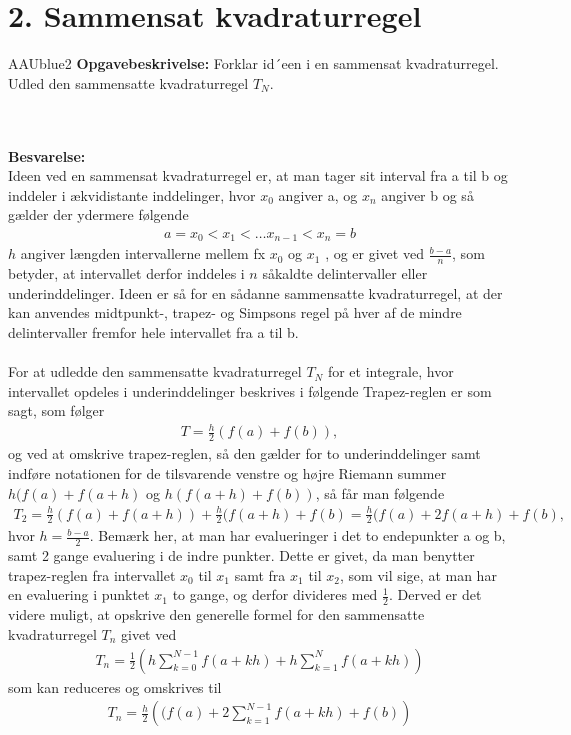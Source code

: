 \section*{2. Sammensat kvadraturregel}
% 
%
\begin{color}{AAUblue2}
%
\textbf{Opgavebeskrivelse:} 
Forklar id´een i en sammensat kvadraturregel. Udled den sammensatte kvadraturregel
$T_N$.
% 
\end{color}
\\\\
% 
\textbf{Besvarelse:} \\
Ideen ved en sammensat kvadraturregel er, at man tager sit interval fra a til b og inddeler i ækvidistante inddelinger, hvor $x_0$ angiver a, og $x_n$ angiver b og så gælder der ydermere følgende
\begin{align*}
a = x_0 < x_1 < … x_{n-1} < x_n = b
\end{align*}
$h$ angiver længden intervallerne mellem fx $x_0$ og $x_1$ , og er givet ved $\frac{b-a}{n}$, som betyder, at intervallet derfor inddeles i $n$ såkaldte delintervaller eller underinddelinger. 
Ideen er så for en sådanne sammensatte kvadraturregel, at der kan anvendes midtpunkt-, trapez- og Simpsons regel på hver af de mindre delintervaller fremfor hele intervallet fra a til b. 
\\\\
For at udledde den sammensatte kvadraturregel $T_N$ for et integrale, hvor intervallet opdeles i underinddelinger beskrives i følgende
Trapez-reglen er som sagt, som følger
\begin{align*}
T = \frac{h}{2}(f(a)+f(b)),
\end{align*}
og ved at omskrive trapez-reglen, så den gælder for to underinddelinger samt indføre notationen for de tilsvarende venstre og højre Riemann summer $h(f(a)+f(a+h)$ og $h(f(a+h)+f(b))$, så får man følgende 
\begin{align*}
T_2=\frac{h}{2}(f(a)+f(a+h))+\frac{h}{2}(f(a+h)+f(b)= \frac{h}{2}(f(a)+2f(a+h)+f(b),
\end{align*}
hvor $h=\frac{b-a}{2}$. Bemærk her, at man har evalueringer i det to endepunkter a og b, samt 2 gange evaluering i de indre punkter. Dette er givet, da man benytter trapez-reglen fra intervallet $x_0$ til $x_1$ samt fra $x_1$ til $x_2$, som vil sige, at man har en evaluering i punktet $x_1$ to gange, og derfor divideres med $\frac{1}{2}$. Derved er det  videre muligt, at opskrive den generelle formel for den sammensatte kvadraturregel $T_n$ givet ved
\begin{align*}
T_n = \frac{1}{2}\left (  h\sum_{k=0}^{N-1}f(a+kh)+h\sum_{k=1}^{N}f(a+kh)\right )
\end{align*}
som kan reduceres og omskrives til 
\begin{align*}
T_n =\frac{h}{2}\left ((f(a)+2\sum_{k=1}^{N-1}f(a+kh)+f(b) \right )
\end{align*}
%